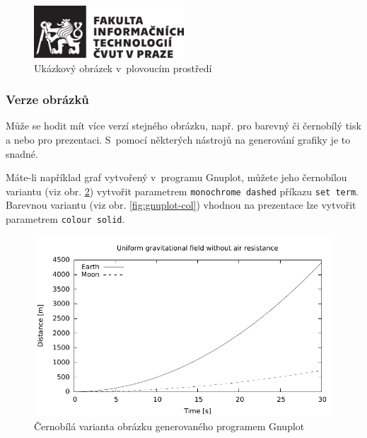 \documentclass[thesis=B,czech]{FITthesis}[2019/12/23]
\begin{document}
\begin{figure}\centering
	\includegraphics[width=0.5\textwidth, angle=30]{cvut-logo-bw}
	\caption[Příklad obrázku]{Ukázkový obrázek v~plovoucím prostředí}\label{fig:float}
\end{figure}

\subsubsection{Verze obrázků}

Může se hodit mít více verzí stejného obrázku, např. pro barevný či černobílý tisk a nebo pro prezentaci. S~pomocí některých nástrojů na generování grafiky je to snadné.

Máte-li například graf vytvořený v~programu Gnuplot, můžete jeho černobílou variantu (viz obr. \ref{fig:gnuplot-bw}) vytvořit parametrem \verb|monochrome dashed| příkazu \verb|set term|. Barevnou variantu (viz obr. \ref{fig:gnuplot-col}) vhodnou na prezentace lze vytvořit parametrem \verb|colour solid|.

\begin{figure}\centering
	\includegraphics{gnuplot-bw}
	\caption[Gnuplot černobíle]{Černobílá varianta obrázku generovaného programem Gnuplot}\label{fig:gnuplot-bw}
\end{figure}
\end{document}
